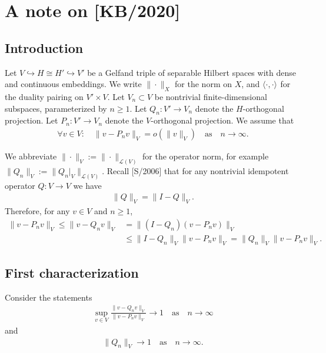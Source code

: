 \documentclass[12pt]{article}
\newcommand{\norm}[2]{\|#1\|_{#2}}
\newcommand{\scalar}[2]{\langle#1\rangle_{#2}}
\newcommand{\from}{\colon}
\renewcommand{\title}{A note on [KB/2020]}
\begin{document}
	
	\section*{\title}
	
	
	\subsection*{Introduction}
	
	
	
	Let $V \hookrightarrow H \cong H' \hookrightarrow V'$
	be a Gelfand triple of separable Hilbert spaces with dense and continuous embeddings.
	We write $\norm{\cdot}{X}$ for the norm on $X$,
	and
	$\scalar{\cdot, \cdot}{}$ for the duality pairing on $V' \times V$.
	Let $V_n \subset V$ be nontrivial finite-dimensional subspaces, 
	parameterized by $n \geq 1$.
	Let $Q_n \from V' \to V_n$ denote the $H$-orthogonal projection.
	Let $P_n \from V' \to V_n$ denote the $V$-orthogonal projection.
	We assume that
	\begin{align}
		\label{e:P}
		\forall v \in V:
		\quad
		\norm{v - P_n v}{V} = o(\norm{v}{V})
		\quad\text{as}\quad
		n \to \infty
		.
	\end{align}
	
	We abbreviate $\norm{\cdot}{V} := \norm{\cdot}{\mathcal{L}(V)}$ 
	for the operator norm,
	for example
	$\norm{Q_n}{V} := \norm{Q_n|_V}{\mathcal{L}(V)}$.
	Recall [S/2006]
	that for any nontrivial idempotent operator $Q \from V \to V$ we have
	\begin{align}
		\label{e:IQ}
		\norm{Q}{V} = \norm{I - Q}{V}
		.
	\end{align}
	Therefore, for any $v \in V$ and $n \geq 1$,
	\begin{align}
		\label{e:approx}
		\norm{v - P_n v}{V}
		\leq
		\norm{v - Q_n v}{V}
		& =
		\norm{(I - Q_n)(v - P_n v)}{V}
		\\
		& \leq
		\norm{I - Q_n}{V} \norm{v - P_n v}{V}
		=
		\norm{Q_n}{V} \norm{v - P_n v}{V}
		.
	\end{align}
	
	
	
	
	\subsection*{First characterization}
	
	
	Consider the statements
	\begin{align}
		\label{e:1}
		\sup_{v \in V}
		\frac{
			\norm{v - Q_n v}{V}
		}{
			\norm{v - P_n v}{V}
		}
		\to 1
		\quad\text{as}\quad
		n \to \infty
	\end{align}
	and
	\begin{align}
		\label{e:Q1}
		\norm{Q_n}{V} \to 1
		\quad\text{as}\quad
		n \to \infty
		.
	\end{align}
	
\end{document}
